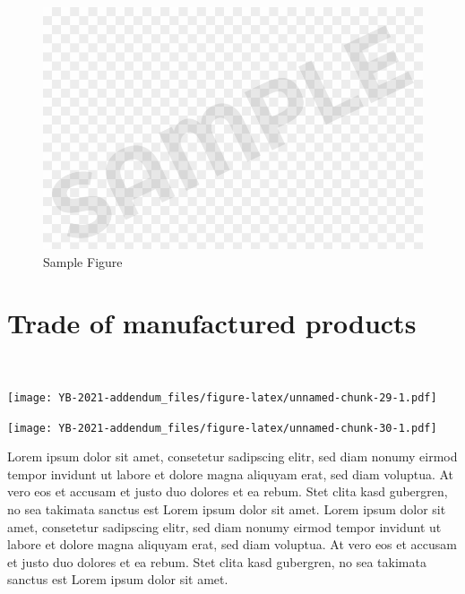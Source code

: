 \documentclass[
  openany, nofonts]{tufte-book}
\begin{document}
\begin{figure}
\includegraphics[width=1\linewidth]{./img/sample_image.png} \caption[Sample Figure]{Sample Figure}\label{fig:unnamed-chunk-27}
\end{figure}

\pagebreak

\hypertarget{trade-of-manufactured-products}{%
\section{Trade of manufactured products}\label{trade-of-manufactured-products}}

~

\begin{marginfigure}
\texttt{[image: YB-2021-addendum\_files/figure-latex/unnamed-chunk-29-1.pdf]} \end{marginfigure}

\begin{marginfigure}
\texttt{[image: YB-2021-addendum\_files/figure-latex/unnamed-chunk-30-1.pdf]} \end{marginfigure}

Lorem ipsum dolor sit amet, consetetur sadipscing elitr, sed diam nonumy eirmod tempor invidunt ut labore et dolore magna aliquyam erat, sed diam voluptua. At vero eos et accusam et justo duo dolores et ea rebum. Stet clita kasd gubergren, no sea takimata sanctus est Lorem ipsum dolor sit amet. Lorem ipsum dolor sit amet, consetetur sadipscing elitr, sed diam nonumy eirmod tempor invidunt ut labore et dolore magna aliquyam erat, sed diam voluptua. At vero eos et accusam et justo duo dolores et ea rebum. Stet clita kasd gubergren, no sea takimata sanctus est Lorem ipsum dolor sit amet.
\end{document}
